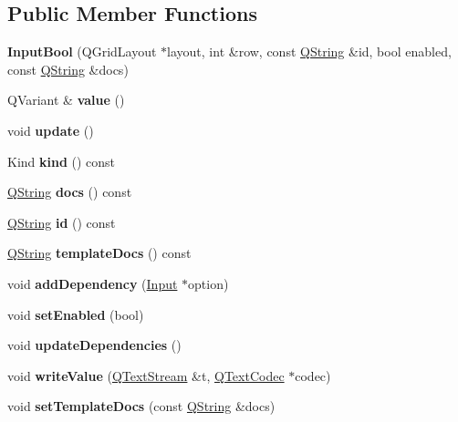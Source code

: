 \subsection*{Public Member Functions}
\begin{DoxyCompactItemize}
\item 
\mbox{\label{class_input_bool_aa88502f4b9003ac1513f4286095348f9}} 
{\bfseries Input\+Bool} (Q\+Grid\+Layout $\ast$layout, int \&row, const \mbox{\hyperlink{class_q_string}{Q\+String}} \&id, bool enabled, const \mbox{\hyperlink{class_q_string}{Q\+String}} \&docs)
\item 
\mbox{\label{class_input_bool_a0798a64139304e63ab3e2c67dcf5d0d6}} 
Q\+Variant \& {\bfseries value} ()
\item 
\mbox{\label{class_input_bool_a4430d88dc8bf58a9166dc84bef7b7782}} 
void {\bfseries update} ()
\item 
\mbox{\label{class_input_bool_ae78db85a95069f14816302cc29e71de4}} 
Kind {\bfseries kind} () const
\item 
\mbox{\label{class_input_bool_aa3e26a2d2cc3f652fc922a6339607083}} 
\mbox{\hyperlink{class_q_string}{Q\+String}} {\bfseries docs} () const
\item 
\mbox{\label{class_input_bool_a404eedb4e51865d57f06831e6a380f8c}} 
\mbox{\hyperlink{class_q_string}{Q\+String}} {\bfseries id} () const
\item 
\mbox{\label{class_input_bool_ac00527e8b03647e59a6b71ae16cdea93}} 
\mbox{\hyperlink{class_q_string}{Q\+String}} {\bfseries template\+Docs} () const
\item 
\mbox{\label{class_input_bool_a36279aa5a2078ccedad5ab36e4106be6}} 
void {\bfseries add\+Dependency} (\mbox{\hyperlink{class_input}{Input}} $\ast$option)
\item 
\mbox{\label{class_input_bool_a4a289ec0e02329cd950fe7ad4a08fe9a}} 
void {\bfseries set\+Enabled} (bool)
\item 
\mbox{\label{class_input_bool_a87d74369df2db35004c265be9c4593ab}} 
void {\bfseries update\+Dependencies} ()
\item 
\mbox{\label{class_input_bool_a4df0a3a3df21135cf337c5cb516d8705}} 
void {\bfseries write\+Value} (\mbox{\hyperlink{class_q_text_stream}{Q\+Text\+Stream}} \&t, \mbox{\hyperlink{class_q_text_codec}{Q\+Text\+Codec}} $\ast$codec)
\item 
\mbox{\label{class_input_bool_ad07ccc2906cd40e6443e83541d85aff0}} 
void {\bfseries set\+Template\+Docs} (const \mbox{\hyperlink{class_q_string}{Q\+String}} \&docs)
\end{DoxyCompactItemize}
